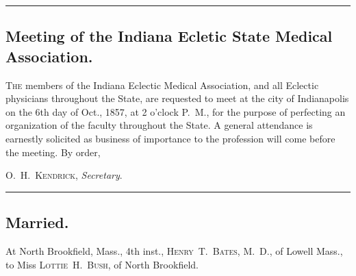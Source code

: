 \fancybreak{* * *}
\subsection*{Meeting of the Indiana Ecletic State Medical Association.}

\lettrine[lines=1]{}{The} members of the Indiana Eclectic Medical Association, and all
Eclectic physicians throughout the State, are requested to meet at the
city of Indianapolis on the 6th day of Oct., 1857, at 2 o'clock P.~M.,
for the purpose of perfecting an organization of the faculty throughout
the State. A general attendance is earnestly solicited as business of importance
to the profession will come before the meeting. By order,

\hfill{}O.~H.\ \textsc{Kendrick}, \emph{Secretary}.

\fancybreak{* * *}
\subsection*{Married.}

\footnotesize
At North Brookfield, Mass., 4th inst., \textsc{Henry~T.\ Bates}, M.~D., of Lowell Mass., to Miss
\textsc{Lottie~H.\ Bush}, of North Brookfield.
\normalsize
\clearpage
